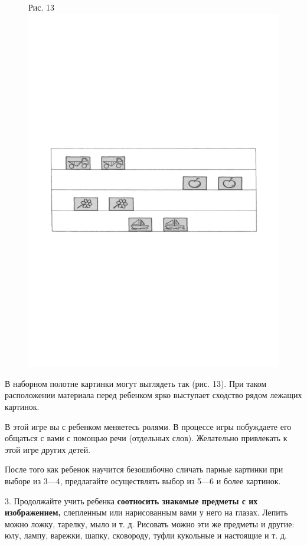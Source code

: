 \documentclass[a5paper]{book}
\begin{document}
\begin{figure}
\centering
Рис. 13\includegraphics[width=\linewidth]{media/media/image13.png}
\end{figure}

В наборном полотне картинки могут выглядеть так (рис. 13). При таком
расположении материала перед ребенком ярко выступает сходство рядом
лежащих картинок.

В этой игре вы с ребенком меняетесь ролями. В процессе игры побуждаете
его общаться с вами с помощью речи (отдельных слов). Желательно
привлекать к этой игре других детей.

После того как ребенок научится безошибочно сличать парные картинки при
выборе из 3---4, предлагайте осуществлять выбор из 5---6 и более
картинок.

3. Продолжайте учить ребенка \textbf{соотносить знакомые предметы с их
изображением,} слепленным или нарисованным вами у него на глазах. Лепить
можно ложку, тарелку, мыло и т. д. Рисовать можно эти же предметы и
другие: юлу, лампу, варежки, шапку, сковороду, туфли кукольные и
настоящие и т. д.
\end{document}
